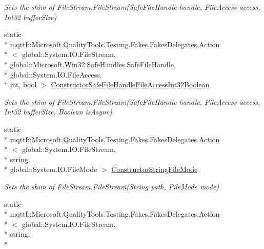 \begin{DoxyCompactItemize}
\begin{DoxyCompactList}\small\item\em Sets the shim of File\-Stream.\-File\-Stream(\-Safe\-File\-Handle handle, File\-Access access, Int32 buffer\-Size)\end{DoxyCompactList}\item 
static \\*
mqttf\-::\-Microsoft.\-Quality\-Tools.\-Testing.\-Fakes.\-Fakes\-Delegates.\-Action\\*
$<$ global\-::\-System.\-I\-O.\-File\-Stream, \\*
global\-::\-Microsoft.\-Win32.\-Safe\-Handles.\-Safe\-File\-Handle, \\*
global\-::\-System.\-I\-O.\-File\-Access, \\*
int, bool $>$ \hyperlink{class_system_1_1_i_o_1_1_fakes_1_1_shim_file_stream_a6b2aa67ff4e81e994c934ed2c704970f}{Constructor\-Safe\-File\-Handle\-File\-Access\-Int32\-Boolean}
\begin{DoxyCompactList}\small\item\em Sets the shim of File\-Stream.\-File\-Stream(\-Safe\-File\-Handle handle, File\-Access access, Int32 buffer\-Size, Boolean is\-Async)\end{DoxyCompactList}\item 
static \\*
mqttf\-::\-Microsoft.\-Quality\-Tools.\-Testing.\-Fakes.\-Fakes\-Delegates.\-Action\\*
$<$ global\-::\-System.\-I\-O.\-File\-Stream, \\*
string, \\*
global\-::\-System.\-I\-O.\-File\-Mode $>$ \hyperlink{class_system_1_1_i_o_1_1_fakes_1_1_shim_file_stream_a5dcdf8d4dee7cc9a634cd6c8099d288c}{Constructor\-String\-File\-Mode}
\begin{DoxyCompactList}\small\item\em Sets the shim of File\-Stream.\-File\-Stream(\-String path, File\-Mode mode)\end{DoxyCompactList}\item 
static \\*
mqttf\-::\-Microsoft.\-Quality\-Tools.\-Testing.\-Fakes.\-Fakes\-Delegates.\-Action\\*
$<$ global\-::\-System.\-I\-O.\-File\-Stream, \\*
string, \\*

\end{DoxyCompactItemize}
